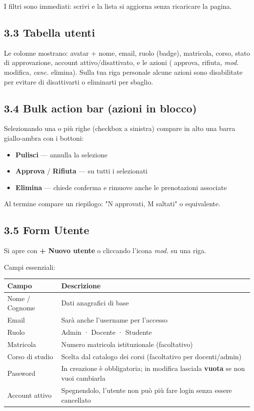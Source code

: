 \documentclass[11pt,a4paper]{article}
\begin{document}
I filtri sono immediati: scrivi e la lista si aggiorna senza ricaricare la pagina.

\subsection{3.3 Tabella utenti}


Le colonne mostrano: avatar + nome, email, ruolo (badge), matricola, corso, stato di approvazione, account attivo/disattivato, e le azioni (\checkmark{} approva, \texttimes{} rifiuta, \textit{mod.} modifica, \textit{canc.} elimina). Sulla tua riga personale alcune azioni sono disabilitate per evitare di disattivarti o eliminarti per sbaglio.

\subsection{3.4 Bulk action bar (azioni in blocco)}


Selezionando una o più righe (checkbox a sinistra) compare in alto una barra giallo-ambra con i bottoni:

\begin{itemize}
  \item \textbf{Pulisci} --- annulla la selezione
  \item \textbf{Approva} / \textbf{Rifiuta} --- su tutti i selezionati
  \item \textbf{Elimina} --- chiede conferma e rimuove anche le prenotazioni associate
\end{itemize}

Al termine compare un riepilogo: "N approvati, M saltati" o equivalente.

\subsection{3.5 Form Utente}


Si apre con \textbf{+ Nuovo utente} o cliccando l'icona \textit{mod.} su una riga.

Campi essenziali:

\begin{table}[H]
\centering
\small
\begin{tabularx}{\linewidth}{|X|X|}
\hline
\rowcolor{tableheader} Campo & Descrizione \\
\hline
Nome / Cognome & Dati anagrafici di base \\
\hline
Email & Sarà anche l'username per l'accesso \\
\hline
Ruolo & Admin · Docente · Studente \\
\hline
Matricola & Numero matricola istituzionale (facoltativo) \\
\hline
Corso di studio & Scelta dal catalogo dei corsi (facoltativo per docenti/admin) \\
\hline
Password & In creazione è obbligatoria; in modifica lasciala \textbf{vuota} se non vuoi cambiarla \\
\hline
Account attivo & Spegnendolo, l'utente non può più fare login senza essere cancellato \\
\hline
\end{tabularx}
\end{table}
\end{document}
